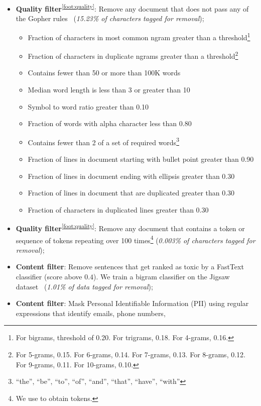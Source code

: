\documentclass{article}
\newcommand*{\fnref}[1]{\textsuperscript{\ref{#1}}}
\begin{document}
\begin{itemize}[leftmargin=1em]
    \item \textbf{Quality filter}\fnref{foot:quality}: Remove any document that does not pass any of the Gopher rules~\citep{Rae2021ScalingLM} (\textit{15.23\% of characters tagged for removal}); 
    \begin{itemize}
        \item Fraction of characters in most common ngram greater than a threshold\footnote{For bigrams, threshold of 0.20. For trigrams, 0.18. For 4-grams, 0.16.}
        \item Fraction of characters in duplicate ngrams greater than a threshold\footnote{For 5-grams, 0.15. For 6-grams, 0.14. For 7-grams, 0.13. For 8-grams, 0.12. For 9-grams, 0.11. For 10-grams, 0.10.}
        \item Contains fewer than 50 or more than 100K words
        \item Median word length is less than 3 or greater than 10
        \item Symbol to word ratio greater than 0.10
        \item Fraction of words with alpha character less than 0.80
        \item Contains fewer than 2 of a set of required words\footnote{``the'', ``be'', ``to'', ``of'', ``and'', ``that'', ``have'', ``with''}
        \item Fraction of lines in document starting with bullet point greater than 0.90
        \item Fraction of lines in document ending with ellipsis greater than 0.30
        \item Fraction of lines in document that are duplicated greater than 0.30
        \item Fraction of characters in duplicated lines greater than 0.30
    \end{itemize}
    \item \textbf{Quality filter}\fnref{foot:quality}: Remove any document that contains a token or sequence of tokens repeating over 100 times\footnote{\label{foot:reps}We use \href{https://huggingface.co/allenai/gpt-neox-olmo-dolma-v1_5}{} to obtain tokens.}
    (\textit{0.003\% of characters tagged for removal}); 
    \item \textbf{Content filter}: Remove sentences that get ranked as toxic by a FastText classifier (score above $0.4$). We train a bigram classifier on the Jigsaw dataset~\citep{jigsaw} (\textit{1.01\% of data tagged for removal});
    \item  \textbf{Content filter}: Mask Personal Identifiable Information (PII) using regular expressions that identify emails, phone numbers, 

\end{itemize}
\end{document}
